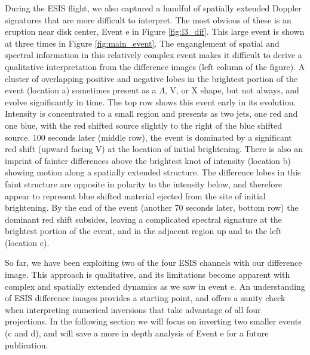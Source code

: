     	During the ESIS flight, we also captured a handful of spatially extended Doppler signatures that are more difficult to interpret.
    	The most obvious of these is an eruption near disk center, Event e in Figure \ref{fig:l3_dif}.
    	This large event is shown at three times in Figure \ref{fig:main_event}.
    	The enganglement of spatial and spectral information in this relatively complex event makes it difficult to derive a qualitative interpretation from the difference images (left column of the figure).
    	A cluster of overlapping positive and negative lobes in the brightest portion of the event (location a) sometimes present as a $\Lambda$, V, or X shape, but not always, and evolve significantly in time.
    	The top row shows this event early in its evolution. 
    	Intensity is concentrated to a small region and presents as two jets, one red and one blue, with the red shifted source slightly to the right of the blue shifted source. %
    	100 seconds later (middle row), the event is dominated by a significant red shift (upward facing V) at the location of initial brightening. 
    	There is also an imprint of fainter differences above the brightest knot of intensity (location b) showing motion along a spatially extended structure.
    	The difference lobes in this faint structure are opposite in polarity to the intensity below, and therefore 
    	appear to represent  blue shifted material ejected from the site of initial brightening.
    	By the end of the event (another 70 seconds later, bottom row) the dominant red shift subsides, leaving a complicated spectral signature at the brightest portion of the event, and in the adjacent region up and to the left (location c).  
    	
    	So far, we have been exploiting two of the four ESIS channels with our difference image. This approach is qualitative,
    	and its limitations become apparent with complex and spatially extended dynamics as we saw in event e.
    	An understanding of ESIS difference images provides a starting point,
    	and offers a sanity check when interpreting numerical inversions that take advantage of all four projections.
    	In the following section we will focus on inverting two smaller events (c and d), and will save a more in depth analysis of Event e for a future publication. 
    	

